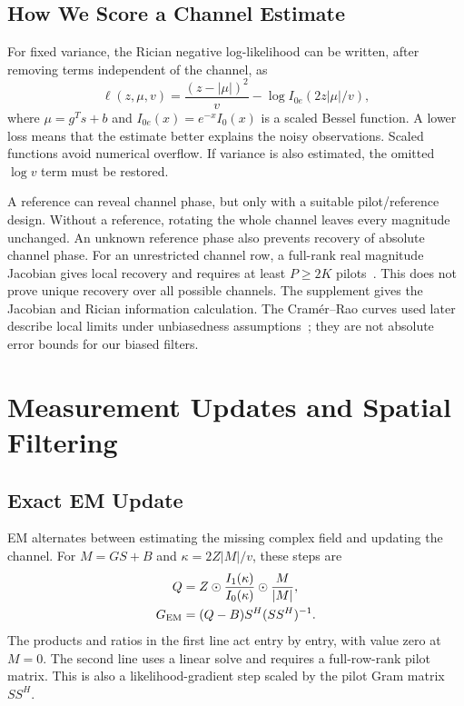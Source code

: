 \documentclass[10pt,journal,letterpaper]{IEEEtran}
\begin{document}
\subsection{How We Score a Channel Estimate}
For fixed variance, the Rician negative log-likelihood can be written, after removing terms independent of the channel, as
\begin{equation}
 \ell(z,\mu,v)=\frac{(z-|\mu|)^2}{v}-\log I_{0e}(2z|\mu|/v),
 \label{eq:loss}
\end{equation}
where $\mu=g^Ts+b$ and $I_{0e}(x)=e^{-x}I_0(x)$ is a scaled Bessel function. A lower loss means that the estimate better explains the noisy observations. Scaled functions avoid numerical overflow. If variance is also estimated, the omitted $\log v$ term must be restored.

A reference can reveal channel phase, but only with a suitable pilot/reference design. Without a reference, rotating the whole channel leaves every magnitude unchanged. An unknown reference phase also prevents recovery of absolute channel phase. For an unrestricted channel row, a full-rank real magnitude Jacobian gives local recovery and requires at least $P\ge2K$ pilots~\cite{gao2018}. This does not prove unique recovery over all possible channels. The supplement gives the Jacobian and Rician information calculation. The Cram\'er--Rao curves used later describe local limits under unbiasedness assumptions~\cite{stoica1998}; they are not absolute error bounds for our biased filters.

\section{Measurement Updates and Spatial Filtering}
\subsection{Exact EM Update}
EM alternates between estimating the missing complex field and updating the channel. For $M=GS+B$ and $\kappa=2Z|M|/v$, these steps are
\begin{align}
 Q&=Z\odot\frac{I_1(\kappa)}{I_0(\kappa)}\odot\frac{M}{|M|},\nonumber\\
 G_{\rm EM}&=(Q-B)S^H(SS^H)^{-1}.
 \label{eq:em}
\end{align}
The products and ratios in the first line act entry by entry, with value zero at $M=0$. The second line uses a linear solve and requires a full-row-rank pilot matrix. This is also a likelihood-gradient step scaled by the pilot Gram matrix $SS^H$.
\end{document}

